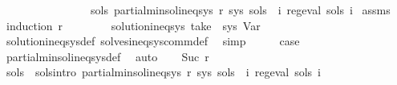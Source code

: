 \begin{isabellebody}
\ \ \ \ \ \ \ \ \ \ \ \ \ \ \ \ {\isachardoublequoteopen}{\isasymexists}sols{\isachardot}{\kern0pt}\ partial{\isacharunderscore}{\kern0pt}min{\isacharunderscore}{\kern0pt}sol{\isacharunderscore}{\kern0pt}ineq{\isacharunderscore}{\kern0pt}sys\ r\ sys\ sols\ {\isasymand}\ {\isacharparenleft}{\kern0pt}{\isasymforall}i{\isachardot}{\kern0pt}\ reg{\isacharunderscore}{\kern0pt}eval\ {\isacharparenleft}{\kern0pt}sols\ i{\isacharparenright}{\kern0pt}{\isacharparenright}{\kern0pt}{\isachardoublequoteclose}\isanewline
%
\isadelimproof
%
\endisadelimproof
%
\isatagproof
{}\isamarkupfalse%
\ assms\ \isamarkupfalse%
\ {\isacharparenleft}{\kern0pt}induction\ r{\isacharparenright}{\kern0pt}\isanewline
\ \ \isamarkupfalse%
\ {}\isanewline
\ \ \isamarkupfalse%
\ {\isachardoublequoteopen}solution{\isacharunderscore}{\kern0pt}ineq{\isacharunderscore}{\kern0pt}sys\ {\isacharparenleft}{\kern0pt}take\ {}\ sys{\isacharparenright}{\kern0pt}\ Var{\isachardoublequoteclose}\isanewline
\ \ \ \ \isamarkupfalse%
\ solution{\isacharunderscore}{\kern0pt}ineq{\isacharunderscore}{\kern0pt}sys{\isacharunderscore}{\kern0pt}def\ solves{\isacharunderscore}{\kern0pt}ineq{\isacharunderscore}{\kern0pt}sys{\isacharunderscore}{\kern0pt}comm{\isacharunderscore}{\kern0pt}def\ \isamarkupfalse%
\ simp\isanewline
\ \ \isamarkupfalse%
\ \isamarkupfalse%
\ {\isacharquery}{\kern0pt}case\ \isamarkupfalse%
\ partial{\isacharunderscore}{\kern0pt}min{\isacharunderscore}{\kern0pt}sol{\isacharunderscore}{\kern0pt}ineq{\isacharunderscore}{\kern0pt}sys{\isacharunderscore}{\kern0pt}def\ \isamarkupfalse%
\ auto\isanewline
{}\isamarkupfalse%
\isanewline
\ \ \isamarkupfalse%
\ {\isacharparenleft}{\kern0pt}Suc\ r{\isacharparenright}{\kern0pt}\isanewline
\ \ \isamarkupfalse%
\ \isamarkupfalse%
\ sols\ \ sols{\isacharunderscore}{\kern0pt}intro{\isacharcolon}{\kern0pt}\ {\isachardoublequoteopen}partial{\isacharunderscore}{\kern0pt}min{\isacharunderscore}{\kern0pt}sol{\isacharunderscore}{\kern0pt}ineq{\isacharunderscore}{\kern0pt}sys\ r\ sys\ sols\ {\isasymand}\ {\isacharparenleft}{\kern0pt}{\isasymforall}i{\isachardot}{\kern0pt}\ reg{\isacharunderscore}{\kern0pt}eval\ {\isacharparenleft}{\kern0pt}sols\ i{\isacharparenright}{\kern0pt}{\isacharparenright}{\kern0pt}{\isachardoublequoteclose}\isanewline

\end{isabellebody}
